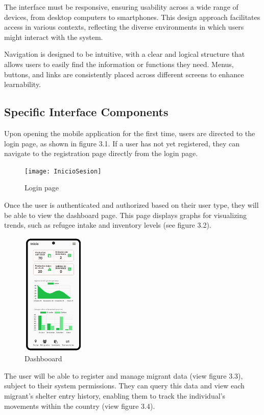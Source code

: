 \documentclass{scrreprt}
\begin{document}
The interface must be responsive, ensuring usability across a wide range of devices, from desktop computers to smartphones. This design approach facilitates access in various contexts, reflecting the diverse environments in which users might interact with the system.

Navigation is designed to be intuitive, with a clear and logical structure that allows users to easily find the information or functions they need. Menus, buttons, and links are consistently placed across different screens to enhance learnability.
\subsection*{Specific Interface Components}
Upon opening the mobile application for the first time, users are directed to the login page, as shown in figure 3.1. If a user has not yet registered, they can navigate to the registration page directly from the login page.
\begin{figure}[H]
    \centering
    \texttt{[image: InicioSesion]}
    \caption{Login page}
\end{figure}
Once the user is authenticated and authorized based on their user type, they will be able to view the dashboard page. This page displays graphs for visualizing trends, such as refugee intake and inventory levels (see figure 3.2).
\begin{figure}[H]
    \centering
    \includegraphics[width=3cm]{Inicio}
    \caption{Dashbooard}
\end{figure}
The user will be able to register and manage migrant data (view figure 3.3), subject to their system permissions. They can query this data and view each migrant's shelter entry history, enabling them to track the individual's movements within the country (view figure 3.4).
\end{document}
